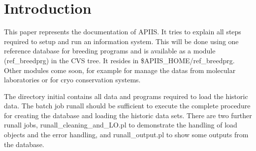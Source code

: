 \chapter{Introduction}

This paper represents the documentation of APIIS. It tries to explain
all steps required to setup and run an information system. This will
be done using one reference database for breeding programs and is
available as a module (ref\_breedprg) in the CVS tree. It resides
in \$APIIS\_HOME/ref\_breedprg. Other modules come soon, for example
for manage the datas from molecular laboratories or for cryo conservation
systems. 

The directory initial contains all data and programs
required to load the historic data. The batch job runall
should be sufficient to execute the complete procedure for creating
the database and loading the historic data sets. There are two further
runall jobs, runall\_cleaning\_and\_LO.pl to demonstrate the handling
of load objects and the error handling, and runall\_output.pl to show
some outputs from the database.
